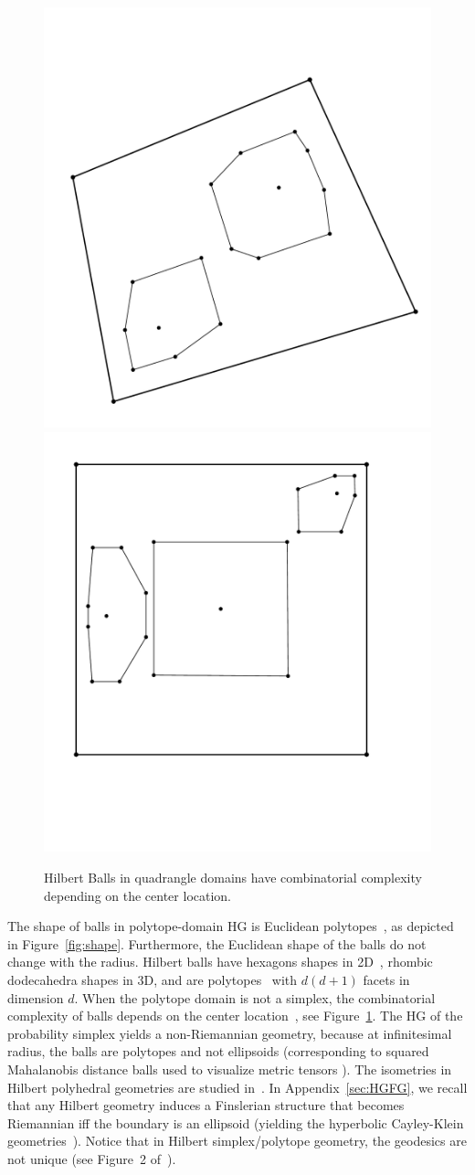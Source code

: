 \documentclass[graybox]{svmult}
\begin{document}
\begin{figure}
\centering
\includegraphics[width=.25\textwidth]{quadrangle}\hskip 3cm
\includegraphics[width=.25\textwidth]{square}
\caption{Hilbert Balls in quadrangle domains have combinatorial complexity depending on the center location.\label{fig:quad}}
\end{figure}



The shape of balls in polytope-domain HG is Euclidean polytopes~\cite{BH-2014},
as depicted in Figure~\ref{fig:shape}.
Furthermore, the Euclidean shape of the balls do not change with the radius.
Hilbert balls have hexagons shapes in 2D~\cite{HG-SoCG-2017}, rhombic dodecahedra shapes in 3D, and are polytopes~\cite{BH-2014} with $d(d+1)$ facets in dimension $d$.
When the polytope domain is not a simplex, the combinatorial complexity of balls depends on the center location~\cite{HG-SoCG-2017}, see Figure~\ref{fig:quad}.
The HG of the probability simplex yields a non-Riemannian geometry, because at infinitesimal radius, the balls are polytopes and not ellipsoids
(corresponding to squared Mahalanobis distance balls used to visualize metric tensors \cite{VizTensor-2009}).
The isometries in Hilbert polyhedral geometries are studied in~\cite{HilbertIsometry-2011}.
In Appendix~\ref{sec:HGFG}, we recall that any Hilbert geometry induces a Finslerian structure
that becomes Riemannian iff the boundary is an ellipsoid (yielding the hyperbolic Cayley-Klein geometries~\cite{Richter-2011}).
Notice that in Hilbert simplex/polytope geometry, the geodesics are not unique (see Figure~2 of~\cite{HilbertHarpe-1991}).
\end{document}
